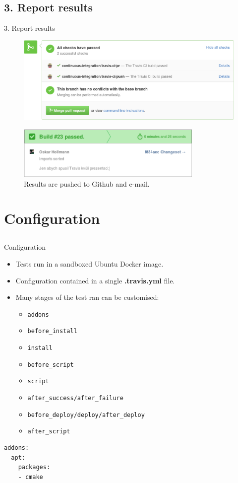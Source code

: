\documentclass[xcolor=x11names,compress,t]{beamer}
\renewcommand{\(}{\begin{columns}[T]}
\renewcommand{\)}{\end{columns}}
\newcommand{\<}[1]{\begin{column}{#1}}
\renewcommand{\>}{\end{column}}
\newenvironment{slide}[1]{\subsection{#1} \begin{frame}{#1}}{\end{frame}}
\begin{document}
\begin{slide}{3. Report results}
\begin{figure}[htb]
    \centering
    \includegraphics[width=\textwidth]{success-github}
\end{figure}
\vspace{-0.5em}
\begin{figure}[htb]
    \centering
    \includegraphics[width=0.8\textwidth]{success-email}
    \caption{Results are pushed to Github and e-mail.}
\end{figure}
\end{slide}

\section{Configuration}

\subsection{}
\begin{frame}[fragile]{Configuration}
\begin{itemize}
    \item Tests run in a sandboxed Ubuntu Docker image.
    \item Configuration contained in a single \textbf{.travis.yml} file.
    \item Many stages of the test ran can be customised:
    \begin{itemize}
      \item \verb+addons+
      \item \verb+before_install+
      \item \verb+install+
      \item \verb+before_script+
      \item \verb+script+
      \item \verb+after_success/after_failure+
      \item \verb+before_deploy/deploy/after_deploy+
      \item \verb+after_script+
    \end{itemize}
\end{itemize}
\begin{verbatim}
addons:
  apt:
    packages:
    - cmake
\end{verbatim}
\end{frame}
\end{document}
